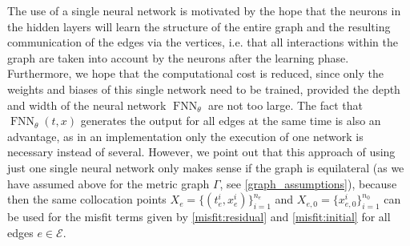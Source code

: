 The use of a single neural network is motivated by the hope that the neurons in the hidden layers will learn the structure of the entire graph and the resulting communication of the edges via the vertices, i.e. that all interactions within the graph are taken into account by the neurons after the learning phase. Furthermore, we hope that the computational cost is reduced, since only the weights and biases of this single network need to be trained, provided the depth and width of the neural network $\operatorname{FNN}_{\theta}$ are not too large. The fact that $\operatorname{FNN}_{\theta}\left(t, x\right)$ generates the output for all edges at the same time is also an advantage, as in an implementation only the execution of one network is necessary instead of several. However, we point out that this approach of using just one single neural network only makes sense if the graph is equilateral (as we have assumed above for the metric graph $\Gamma$, see \cref{graph_assumptions}), because then the same collocation points $X_e = \{ \left( t_e^i, x_e^i \right)\}_{i=1}^{n_e}$ and $X_{e,0} = \{x_{e,0}^i\}_{i=1}^{n_0}$ can be used for the misfit terms given by \cref{misfit:residual} and \cref{misfit:initial} for all edges $e \in \mathcal{E}$. \\

